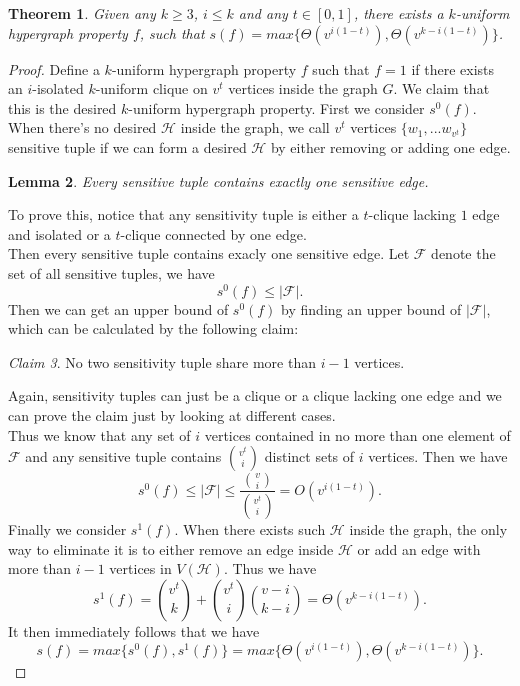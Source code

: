 \documentclass[psamsfonts]{amsart}
\newtheorem{theorem}{Theorem}[section]
\newtheorem{lem}[theorem]{Lemma}
\theoremstyle{definition}
\theoremstyle{remark}
\newtheorem{claim}[theorem]{Claim}
\numberwithin{equation}{section}
\begin{document}
	\begin{theorem}
		Given any $k\geq 3$, $i \leq k$ and any $t \in [0,1]$, there exists a $k$-uniform hypergraph property $f$, such that $s(f) = max\{\Theta(v^{i(1-t)}), \Theta(v^{k-i(1-t)})\}$.
	\end{theorem}
	\begin{proof}
		Define a $k$-uniform hypergraph property $f$ such that $f=1$ if there exists an $i$-isolated $k$-uniform clique on $v^t$ vertices inside the graph $G$.
		\indent We claim that this is the desired $k$-uniform hypergraph property. First we consider $s^0(f)$. When there's no desired $\mathcal{H}$ inside the graph, we call $v^t$ vertices $\{w_1,...w_{v^t}\}$ sensitive tuple if we can form a desired $\mathcal{H}$ by either removing or adding one edge. 
		\begin{lem}
			Every sensitive tuple contains exactly one sensitive edge.
		\end{lem}
		To prove this, notice that any sensitivity tuple is either a $t$-clique lacking $1$ edge and isolated or a $t$-clique connected by one edge.\\
		 \indent Then every sensitive tuple contains exacly one sensitive edge. Let $\mathcal{F}$ denote the set of all sensitive tuples, we have
		\begin{equation}
			s^0(f) \leq |\mathcal{F}|. \nonumber
		\end{equation}
		Then we can get an upper bound of $s^0(f)$ by finding an upper bound of $|\mathcal{F}|$, which can be calculated by the following claim:
		\begin{claim}
			No two sensitivity tuple share more than $i-1$ vertices.
		\end{claim}
		Again, sensitivity tuples can just be a clique or a clique lacking one edge and we can prove the claim just by looking at different cases.\\
		
		\indent Thus we know that any set of $i$ vertices contained in no more than one element of $\mathcal{F}$ and any sensitive tuple contains $v^t \choose{i}$ distinct sets of $i$ vertices. Then we have
		\begin{equation}
			s^0(f) \leq |\mathcal{F}| \leq \frac{{v \choose{i}}}{{v^t \choose{i}}} = O(v^{i(1-t)}). \nonumber
		\end{equation}
		Finally we consider $s^1(f)$. When there exists such $\mathcal{H}$ inside the graph, the only way to eliminate it is to either remove an edge inside $\mathcal{H}$ or add an edge with more than $i-1$ vertices in $V(\mathcal{H})$. Thus we have
		\begin{equation}
			s^1(f) = {v^t \choose{k}} + {v^t \choose{i}}{v-i \choose{k-i}} = \Theta (v^{k-i(1-t)}). \nonumber
		\end{equation}
		It then immediately follows that we have
		\begin{equation}
			s(f)= max\{s^0(f),s^1(f)\} = max\{ \Theta(v^{i(1-t)}),  \Theta(v^{k-i(1-t)})\}. \nonumber
		\end{equation}
	\end{proof}
\end{document}
